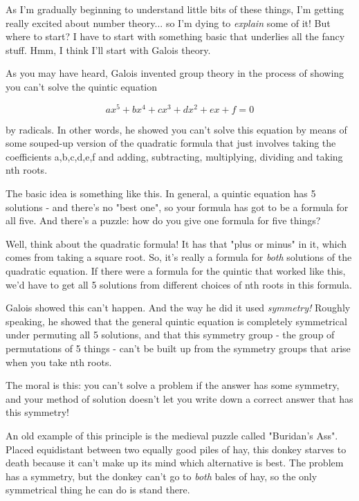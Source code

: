 As I'm gradually beginning to understand little bits of these things, 
I'm getting really excited about number theory... so I'm dying to 
\emph{explain}
some of it!  But where to start?  I have to start with something basic that
underlies all the fancy stuff.  Hmm, I think I'll start with Galois theory.

As you may have heard, Galois invented group theory in the process of
showing you can't solve the quintic equation

$$
ax^{5} + bx^{4} + cx^{3} + dx^{2} + ex + f = 0
$$
    
by radicals.  In other words, he showed you can't solve this equation 
by means of some souped-up version of the quadratic formula that just 
involves taking the coefficients a,b,c,d,e,f and adding, subtracting, 
multiplying, dividing and taking nth roots.
  
The basic idea is something like this.  In general, a quintic equation 
has 5 solutions - and there's no "best one", so your formula has 
got to 
be a formula for all five.  And there's a puzzle: how do you give one 
formula for five things?  

Well, think about the quadratic formula!   It has that "plus 
or minus" 
in it, which comes from taking a square root.  So, it's really a formula 
for \emph{both} solutions of the quadratic equation.  If there were a formula 
for the quintic that worked like this, we'd have to get all 5 solutions 
from different choices of nth roots in this formula.

Galois showed this can't happen.  And the way he did it used \emph{symmetry!}
Roughly speaking, he showed that the general quintic equation is completely 
symmetrical under permuting all 5 solutions, and that this symmetry group - 
the group of permutations of 5 things - can't be built up from the symmetry
groups that arise when you take nth roots.  

The moral is this: you can't solve a problem if the answer has some 
symmetry, and your method of solution doesn't let you write down a correct
answer that has this symmetry!   

An old example of this principle is the medieval puzzle called "Buridan's
Ass".  Placed equidistant between two equally good piles of hay, this
donkey starves to death because it can't make up its mind which alternative
is best.  The problem has a symmetry, but the donkey can't go to \emph{both}
bales of hay, so the only symmetrical thing he can do is stand there.  


